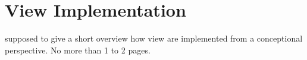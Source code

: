 \documentclass[preview]{standalone}
\begin{document}
\section{View Implementation}
supposed to give a short overview how view are implemented from a conceptional perspective. No more than 1 to 2 pages.
\end{document}

